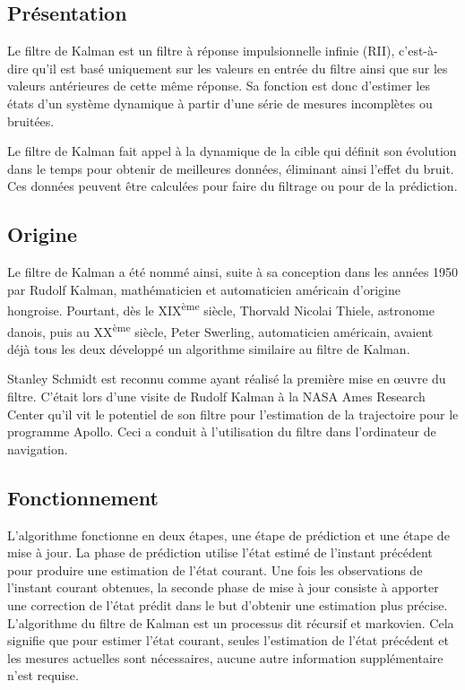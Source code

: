 \subsection{Présentation} 

\indent Le filtre de Kalman est un filtre à réponse impulsionnelle infinie (RII), c’est-à-dire qu'il est basé uniquement sur les valeurs en entrée du filtre ainsi que sur les valeurs antérieures de cette même réponse. Sa fonction est donc d'estimer les états d’un système dynamique à partir d'une série de mesures incomplètes ou bruitées.

Le filtre de Kalman fait appel à la dynamique de la cible qui définit son évolution dans le temps pour obtenir de meilleures données, éliminant ainsi l'effet du bruit. Ces données peuvent être calculées pour faire du filtrage ou pour de la prédiction.

\subsection{Origine}

\indent Le filtre de Kalman a été nommé ainsi, suite à sa conception dans les années 1950 par Rudolf Kalman, mathématicien et automaticien américain d'origine hongroise. Pourtant, dès le XIX\textsuperscript{ème} siècle, Thorvald Nicolai Thiele, astronome danois, puis au XX\textsuperscript{ème} siècle, Peter Swerling, automaticien américain, avaient déjà tous les deux développé un algorithme similaire au filtre de Kalman.

\indent Stanley Schmidt est reconnu comme ayant réalisé la première mise en œuvre du filtre. C'était lors d'une visite de Rudolf Kalman à la NASA Ames Research Center qu'il vit le potentiel de son filtre pour l'estimation de la trajectoire pour le programme Apollo. Ceci a conduit à l'utilisation du filtre dans l'ordinateur de navigation.

\subsection{Fonctionnement}

\indent L'algorithme fonctionne en deux étapes, une étape de prédiction et une étape de mise à jour. La phase de prédiction utilise l'état estimé de l'instant précédent pour produire une estimation de l'état courant. Une fois les observations de l’instant courant obtenues, la seconde phase de mise à jour consiste à apporter une correction de l'état prédit dans le but d'obtenir une estimation plus précise. L'algorithme du filtre de Kalman est un processus dit récursif et markovien. Cela signifie que pour estimer l'état courant, seules l'estimation de l'état précédent et les mesures actuelles sont nécessaires, aucune autre information supplémentaire n’est requise. \\

